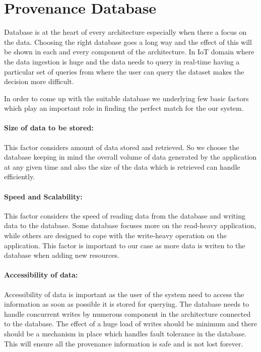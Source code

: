 \section{Provenance Database}

Database is at the heart of every architecture especially when there a focus on the data. Choosing the right database goes a long way and the effect of this will be shown in each and every component of the architecture. In IoT domain where the data ingestion is huge and the data needs to query in real-time having a particular set of queries from where the user can query the dataset makes the decision more difficult.

In order to come up with the suitable database we underlying few basic factors which play an important role in finding the perfect match for the our system.

\paragraph*{Size of data to be stored:}
This factor considers amount of data stored and retrieved. So we choose the database keeping in mind the overall volume of data generated by the application at any given time and also the size of the data which is retrieved can handle efficiently.

\paragraph*{Speed and Scalability:}
This factor considers the speed of reading data from the database and writing data to the database. Some database focuses more on the read-heavy application, while others are designed to cope with the write-heavy operation on the application. This factor is important to our case as more data is writen to the database when adding new resources.

\paragraph*{Accessibility of data:}
Accessibility of data is important as the user of the system need to access the information as soon as possible it is stored for querying. The database needs to handle concurrent writes by numerous component in the architecture connected to the database. The effect of a huge load of writes should be minimum and there should be a mechanism in place which handles fault tolerance in the database. This will ensure all the provenance information is safe and is not lost forever.

